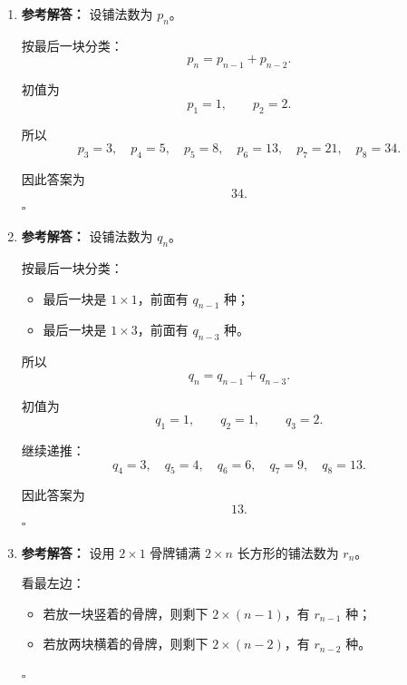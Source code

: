 \documentclass[11pt,a4paper,fontset=fandol]{ctexart}
\newenvironment{solution}{\par\noindent\textbf{参考解答：}}{\hfill$\square$\par}
\begin{document}
\begin{enumerate}
\begin{solution}
  一个合法串的结尾只能是以下三类之一：
  \begin{itemize}
    \item B；
    \item AB；
    \item AAB。
  \end{itemize}

  所以
  \[
  b_n=b_{n-1}+b_{n-2}+b_{n-3}.
  \]

  初值：
  \[
  b_1=2,\qquad b_2=4,\qquad b_3=7.
  \]

  因此
  \[
  b_4=13,\quad b_5=24,\quad b_6=44,\quad b_7=81.
  \]

  所以答案为
  \[
  81.
  \]
  \end{solution}

  \item \begin{solution}
  设铺法数为 $p_n$。

  按最后一块分类：
  \[
  p_n=p_{n-1}+p_{n-2}.
  \]

  初值为
  \[
  p_1=1,\qquad p_2=2.
  \]

  所以
  \[
  p_3=3,\quad p_4=5,\quad p_5=8,\quad p_6=13,\quad p_7=21,\quad p_8=34.
  \]

  因此答案为
  \[
  34.
  \]
  \end{solution}

  \item \begin{solution}
  设铺法数为 $q_n$。

  按最后一块分类：
  \begin{itemize}
    \item 最后一块是 $1\times 1$，前面有 $q_{n-1}$ 种；
    \item 最后一块是 $1\times 3$，前面有 $q_{n-3}$ 种。
  \end{itemize}

  所以
  \[
  q_n=q_{n-1}+q_{n-3}.
  \]

  初值为
  \[
  q_1=1,\qquad q_2=1,\qquad q_3=2.
  \]

  继续递推：
  \[
  q_4=3,\quad q_5=4,\quad q_6=6,\quad q_7=9,\quad q_8=13.
  \]

  因此答案为
  \[
  13.
  \]
  \end{solution}

  \item \begin{solution}
  设用 $2\times 1$ 骨牌铺满 $2\times n$ 长方形的铺法数为 $r_n$。

  看最左边：
  \begin{itemize}
    \item 若放一块竖着的骨牌，则剩下 $2\times(n-1)$，有 $r_{n-1}$ 种；
    \item 若放两块横着的骨牌，则剩下 $2\times(n-2)$，有 $r_{n-2}$ 种。
  \end{itemize}


\end{solution}
\end{enumerate}
\end{document}
